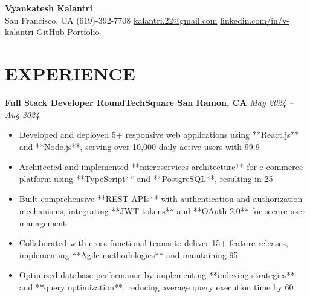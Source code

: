 \documentclass[letterpaper,10pt]{article}
\begin{document}
\begin{center}
    {\huge \textbf{Vyankatesh Kalantri}} \\
    \vspace{0.2cm}
    \faMapMarker{} San Francisco, CA \hspace{1em}
    \faPhone{} (619)-392-7708 \hspace{1em}
    \faEnvelope{} \href{mailto:kalantri.22@gmail.com}{kalantri.22@gmail.com} \hspace{1em}
    \faLinkedin{} \href{https://www.linkedin.com/in/v-kalantri}{linkedin.com/in/v-kalantri} \hspace{1em}
    \vspace{0.2cm}
    \faGithub{} \href{https://github.com/Kalantri007}{GitHub } \hspace{1em}
    \faGlobe{} \href{https://kalantri007.github.io/Portfolio/}{Portfolio}
\end{center}

\section*{\large EXPERIENCE}

\noindent
\textbf{Full Stack Developer \textbar{} RoundTechSquare \textbar{} San Ramon, CA} \hfill \textit{May 2024 -- Aug 2024}
\begin{itemize}[itemsep=0cm, topsep=0.1cm]
\justifying
    \item Developed and deployed 5+ responsive web applications using **React.js** and **Node.js**, serving over 10,000 daily active users with 99.9%
    \item Architected and implemented **microservices architecture** for e-commerce platform using **TypeScript** and **PostgreSQL**, resulting in 25%
    \item Built comprehensive **REST APIs** with authentication and authorization mechanisms, integrating **JWT tokens** and **OAuth 2.0** for secure user management
    \item Collaborated with cross-functional teams to deliver 15+ feature releases, implementing **Agile methodologies** and maintaining 95%
    \item Optimized database performance by implementing **indexing strategies** and **query optimization**, reducing average query execution time by 60%
\end{itemize}
\end{document}
